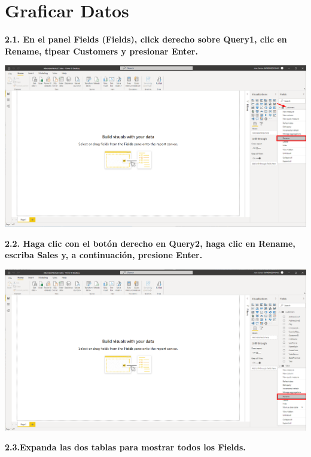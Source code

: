 \documentclass{article}
\begin{document}
\newpage

\section{Graficar Datos}

\textbf{2.1. En el panel \textbf{Fields} \textbf{(Fields)}, click derecho sobre \textbf{Query1}, clic en \textbf{Rename}, tipear \textbf{Customers} y presionar Enter.}

    \begin{center}
		\includegraphics[width=14cm]{./images/14} 
	\end{center}
	
\textbf{2.2. Haga clic con el botón derecho en \textbf{Query2}, haga clic en \textbf{Rename}, escriba \textbf{Sales} y, a continuación, presione Enter.}

    \begin{center}
		\includegraphics[width=14cm]{./images/15} 
	\end{center}
	
\textbf{2.3.Expanda las dos tablas para mostrar todos los \textbf{Fields}.}
\end{document}
